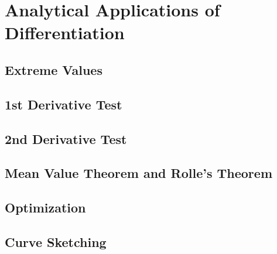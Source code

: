\documentclass[../abcalc.tex]{subfiles}
\begin{document}
\chapter{Analytical Applications of Differentiation}
\section{Extreme Values}
\section{1st Derivative Test}
\section{2nd Derivative Test}
\section{Mean Value Theorem and Rolle's Theorem}
\section{Optimization}
\section{Curve Sketching}
\end{document}
